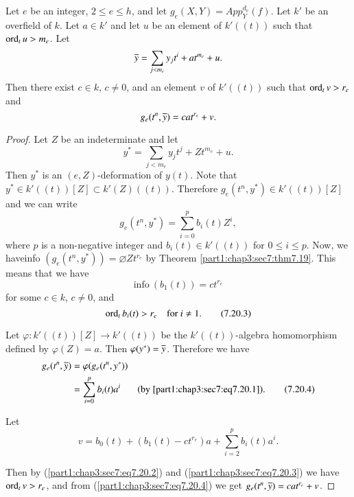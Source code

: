 \begin{coro}\label{part1:chap3:sec7:coro7.20}
  Let $e$ be an integer, $2 \leq e \leq h$, and let $g_e (X, Y)= App_Y^{d_e} (f)$. Let $k'$ be an overfield of $k$. Let $a \in k'$ and let $u$ be an element of $k'((t))$ such that $\operatorname{ord}_t u> m_e$. Let
$$
\overline{y} = \sum_{j < m_e} y_jt^i + at^{m_e} +u.
$$
Then there exist $c \in k$, $c \neq 0$, and an element $v$ of $k'((t))$ such that $\operatorname{ord}_t v> r_e$ and 
$$
g_e (t^n, \overline{y}) = cat^{r_e} +v.
$$
\end{coro}

\begin{proof}
  Let $Z$ be an indeterminate and let
$$
y^* = \sum_{j < m_e} y_j t^j + Z t^{m_e} + u.
$$
Then $y^*$ is an $(e, Z)$-deformation of $y(t)$. Note that $y^* \in k' ((t)) [Z] \subset k' (Z) ((t))$. Therefore $g_e (t^n, y^*) \in k' ((t)) [Z]$ and we can write
\begin{equation*}
  g_e (t^n, y^*) = \sum^p_{i=0} b_i (t) Z^i, \tag{7.20.1}\label{part1:chap3:sec7:eq7.20.1}
\end{equation*}
where $p$ is a non-negative integer and $b_i(t) \in k' ((t))$ for $0 \leq i \leq p$. Now, we have\pageoriginale info $(g_e (t^n, y^*)) = \diameter Z t^{r_e}$ by Theorem \ref{part1:chap3:sec7:thm7.19}. This means that we have 
\begin{equation*}
  \text{info}~ (b_1 (t)) = ct^{r_e} \tag{7.20.2} \label{part1:chap3:sec7:eq7.20.2}
\end{equation*}
for some $c \in k$, $c \neq 0$, and 
\begin{equation*}
  \operatorname{ord}_t b_i (t)> r_e \quad \text{for}~ i \neq 1.\tag{7.20.3} \label{part1:chap3:sec7:eq7.20.3}
\end{equation*}

Let $\varphi : k' ((t))[Z] \to k' ((t))$ be the $k' ((t))$-algebra homomorphism defined by $\varphi (Z)=a$. Then $\varphi (y^*)= \overline{y}$. Therefore we have
\begin{align*}
  g_e (t^n , \overline{y}) & = \varphi (g_e (t^n, y^*))&\\
  & = \sum_{i=0}^p b_i (t) a^i & \text{(by \ref{part1:chap3:sec7:eq7.20.1}).}\tag{7.20.4} \label{part1:chap3:sec7:eq7.20.4}
\end{align*}

Let 
$$
v = b_0 (t) + (b_1 (t) - ct^{r_e}) a+ \sum^p_{i=2} b_i (t) a^i.
$$

Then by (\ref{part1:chap3:sec7:eq7.20.2}) and (\ref{part1:chap3:sec7:eq7.20.3}) we have $\operatorname{ord}_t v> r_e$, and from (\ref{part1:chap3:sec7:eq7.20.4}) we get $g_e (t^n, \overline{y})= cat^{r_e}+ v$.
\end{proof}

